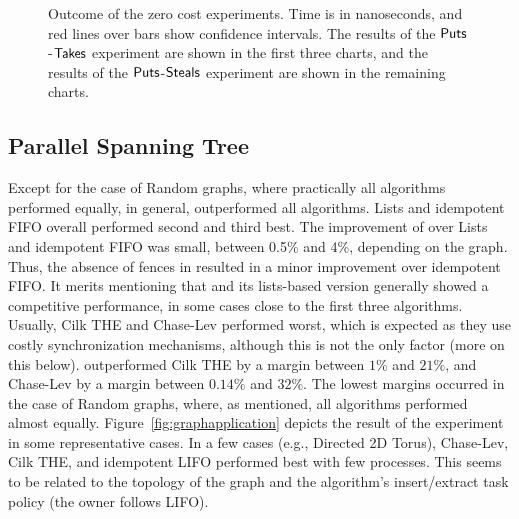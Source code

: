 \begin{figure}[!ht]
{  }

  \caption{\label{fig:zerocost} Outcome of the zero cost experiments. Time is in nanoseconds, and red lines over bars show confidence intervals. The results of the ${\sf Puts}$-${\sf Takes}$ experiment are shown in the first three charts, and the results of the ${\sf Puts}$-${\sf Steals}$ experiment are shown in the remaining charts.}

\end{figure}


\subsection{Parallel Spanning Tree}


Except for the case of Random graphs, where practically all algorithms performed equally, in general, \NCWSM{} outperformed all algorithms.  \NCWSM Lists and idempotent FIFO overall performed second and third best. The improvement of \NCWSM{} over \NCWSM Lists and idempotent FIFO was small, between 0.5\% and 4\%, depending on the graph. Thus, the absence of fences in \NCWSM{} resulted in a minor improvement over idempotent FIFO. It merits mentioning that \BNCWSM and its lists-based version generally showed a competitive performance, in some cases close to the first three algorithms. Usually, Cilk THE and Chase-Lev performed worst, which is expected as they use costly synchronization mechanisms, although this is not the only factor (more on this below).  \NCWSM outperformed Cilk THE by a margin between $1\%$ and $21\%$, and Chase-Lev by a margin between $0.14\%$ and $32\%$.  The lowest margins occurred in the case of Random graphs, where, as mentioned, all algorithms performed almost equally. Figure~\ref{fig:graphapplication} depicts the result of the experiment in some representative cases. In a few cases (e.g., Directed 2D Torus), Chase-Lev, Cilk THE, and idempotent LIFO performed best with few processes. This seems to be related to the topology of the graph and the algorithm's insert/extract task policy (the owner follows LIFO).

